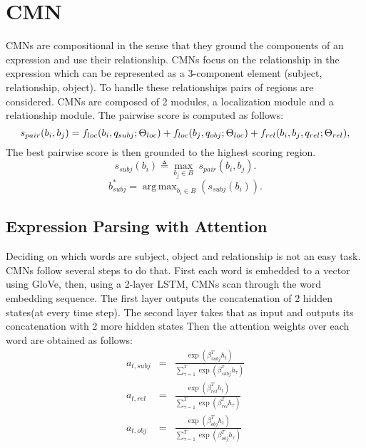 \documentclass{article}
\DeclareMathOperator*{\argmax}{arg\,max}
\begin{document}
	 \section{CMN}
	 CMNs are compositional in the sense that they ground the components of an expression and use their relationship. CMNs focus on the relationship in the expression which can be represented as a 3-component element (subject, relationship, object). To handle these relationships pairs of regions are considered. CMNs are composed of 2 modules, a localization module and a relationship module. The pairwise score is computed as follows:
	 \begin{equation}
	 s_{pair}(b_i, b_j) = f_{loc}(b_i, q_{subj}; \Theta_{loc}) \\
	 + f_{loc}(b_j, q_{obj}; \Theta_{loc}) \\
	 + f_{rel}(b_i, b_j, q_{rel}; \Theta_{rel}),
	 \end{equation}
	 The best pairwise score is then grounded to the highest scoring region.
	 \begin{equation}
	 s_{subj}(b_i) \triangleq \max_{b_j \in B}\; s_{pair}(b_i, b_j).
	 \end{equation}
	 \begin{equation}
	 b^*_{subj} = \argmax_{b_i \in B} (s_{subj}(b_i)).
	 \end{equation}
	\subsection{Expression Parsing with Attention}
	Deciding on which words are subject, object  and relationship is not an easy task. CMNs follow several steps to do that. First each word is embedded to a vector using GloVe, then, using a 2-layer LSTM, CMNs scan through the word embedding sequence. The first layer outputs the concatenation of 2 hidden states(at every time step). The second layer takes that as input and outputs its concatenation with 2 more hidden states Then the attention weights over each word are obtained as follows:
	\begin{eqnarray}
	a_{t, subj} &=& \frac{\exp\left(\beta_{subj}^T h_t\right)}{\sum_{\tau=1}^T \exp\left(\beta_{subj}^T h_\tau\right)} \\
	a_{t, rel} &=& \frac{\exp\left(\beta_{rel}^T h_t\right)}{\sum_{\tau=1}^T \exp\left(\beta_{rel}^T h_\tau\right)} \\
	a_{t, obj} &=& \frac{\exp\left(\beta_{obj}^T h_t\right)}{\sum_{\tau=1}^T \exp\left(\beta_{obj}^T h_\tau\right)}
	\end{eqnarray}
	
\end{document}
